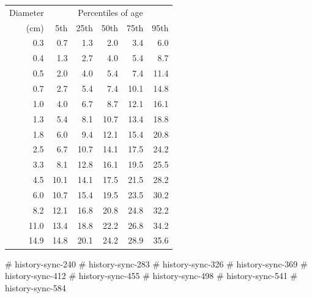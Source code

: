 \begin{tabular}{|r||r|r|r|r|r|}
\hline
Diameter   & \multicolumn{5}{c|}{Percentiles of age} \\
(cm)   & 5th & 25th & 50th & 75th & 95th \\
\hline
0.3 & 0.7  & 1.3  & 2.0  & 3.4  & 6.0 \\
0.4 & 1.3  & 2.7  & 4.0  & 5.4  & 8.7 \\
0.5 & 2.0  & 4.0  & 5.4  & 7.4  & 11.4 \\
0.7 & 2.7  & 5.4  & 7.4  & 10.1  & 14.8 \\
1.0 & 4.0  & 6.7  & 8.7  & 12.1  & 16.1 \\
1.3 & 5.4  & 8.1  & 10.7  & 13.4  & 18.8 \\
1.8 & 6.0  & 9.4  & 12.1  & 15.4  & 20.8 \\
2.5 & 6.7  & 10.7  & 14.1  & 17.5  & 24.2 \\
3.3 & 8.1  & 12.8  & 16.1  & 19.5  & 25.5 \\
4.5 & 10.1  & 14.1  & 17.5  & 21.5  & 28.2 \\
6.0 & 10.7  & 15.4  & 19.5  & 23.5  & 30.2 \\
8.2 & 12.1  & 16.8  & 20.8  & 24.8  & 32.2 \\
11.0 & 13.4  & 18.8  & 22.2  & 26.8  & 34.2 \\
14.9 & 14.8  & 20.1  & 24.2  & 28.9  & 35.6 \\
\hline
\end{tabular}
# history-sync-240
# history-sync-283
# history-sync-326
# history-sync-369
# history-sync-412
# history-sync-455
# history-sync-498
# history-sync-541
# history-sync-584

